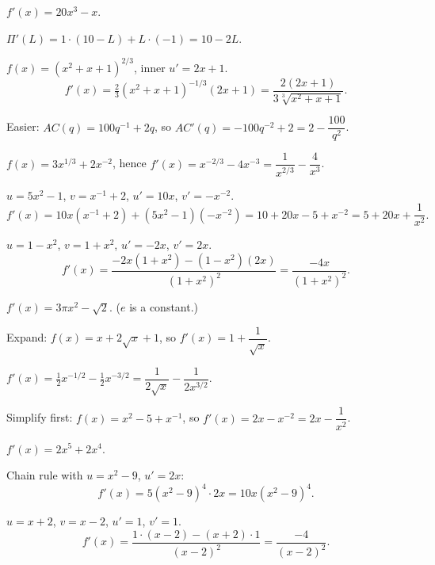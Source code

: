\begin{solutions}
  \item $f'(x)=20x^{3}-x$.

  \item $\Pi'(L)=1\cdot(10-L)+L\cdot(-1)=10-2L$.

  \item $f(x)=(x^{2}+x+1)^{2/3}$, inner $u'=2x+1$.
        \[
          f'(x)=\tfrac23(x^{2}+x+1)^{-1/3}(2x+1)
               =\frac{2(2x+1)}{3\sqrt[3]{x^{2}+x+1}} .
        \]

  \item Easier: $AC(q)=100q^{-1}+2q$, so $AC'(q)=-100q^{-2}+2
        =2-\dfrac{100}{q^{2}}$.

  \item $f(x)=3x^{1/3}+2x^{-2}$, hence $f'(x)=x^{-2/3}-4x^{-3}
        =\dfrac{1}{x^{2/3}}-\dfrac{4}{x^{3}}$.

  \item $u=5x^{2}-1$, $v=x^{-1}+2$, $u'=10x$, $v'=-x^{-2}$.
        \[
          f'(x)=10x(x^{-1}+2)+(5x^{2}-1)(-x^{-2})
               =10+20x-5+x^{-2}=5+20x+\frac{1}{x^{2}} .
        \]

  \item $u=1-x^{2}$, $v=1+x^{2}$, $u'=-2x$, $v'=2x$.
        \[
          f'(x)=\frac{-2x(1+x^{2})-(1-x^{2})(2x)}{(1+x^{2})^{2}}
               =\frac{-4x}{(1+x^{2})^{2}} .
        \]

  \item $f'(x)=3\pi x^{2}-\sqrt{2}$. ($e$ is a constant.)

  \item Expand: $f(x)=x+2\sqrt{x}+1$, so $f'(x)=1+\dfrac{1}{\sqrt{x}}$.

  \item $f'(x)=\tfrac12x^{-1/2}-\tfrac12x^{-3/2}
        =\dfrac{1}{2\sqrt{x}}-\dfrac{1}{2x^{3/2}}$.

  \item Simplify first: $f(x)=x^{2}-5+x^{-1}$, so $f'(x)=2x-x^{-2}
        =2x-\dfrac{1}{x^{2}}$.

  \item $f'(x)=2x^{5}+2x^{4}$.

  \item Chain rule with $u=x^{2}-9$, $u'=2x$:
        \[
          f'(x)=5(x^{2}-9)^{4}\cdot 2x=10x(x^{2}-9)^{4} .
        \]

  \item $u=x+2$, $v=x-2$, $u'=1$, $v'=1$.
        \[
          f'(x)=\frac{1\cdot(x-2)-(x+2)\cdot 1}{(x-2)^{2}}
               =\frac{-4}{(x-2)^{2}} .
        \]


\end{solutions}
